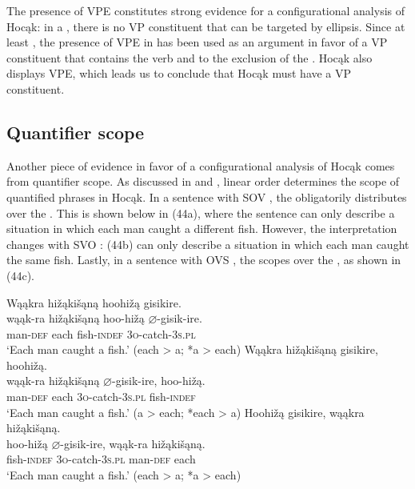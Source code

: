 \documentclass[output=paper]{LSP/langsci}
\begin{document}
The presence of VPE constitutes strong evidence for a configurational analysis of Hocąk: in a , there is no VP constituent that can be targeted by ellipsis. Since at least \citet{Ross1969}, the presence of VPE in  has been used as an argument in favor of a VP constituent that contains the verb and  to the exclusion of the . Hocąk also displays VPE, which leads us to conclude that Hocąk must have a VP constituent.

\subsection{Quantifier scope}

Another piece of evidence in favor of a configurational analysis of Hocąk comes from quantifier scope. As discussed in \citet{Johnson2014} and \citet{JohnsonRosen2014}, linear order determines the scope of quantified phrases in Hocąk. In a sentence with SOV , the  obligatorily distributes over the . This is shown below in (44a), where the sentence can only describe a situation in which each man caught a different fish. However, the interpretation changes with SVO : (44b) can only describe a situation in which each man caught the same fish. Lastly, in a sentence with OVS , the  scopes over the , as shown in (44c).

\begin{exe}
\ex\label{ex:jrs:44}
\begin{xlist}
\ex 
\glll Wąąkra	hi\v{z}ąki\v{s}ąną		hoohi\v{z}ą	gisikire.\\
wąąk-ra		hi\v{z}ąki\v{s}ąną		hoo-hi\v{z}ą	$\varnothing$-gisik-ire. \\
		man-\textsc{def}		each					fish-\textsc{indef}		\textsc{3o}-catch-\textsc{3s.pl} \\
\trans `Each man caught a fish.' (each > a; *a > each)
\ex 
\glll Wąąkra		hi\v{z}ąki\v{s}ąną		gisikire,			hoohi\v{z}ą.\\
wąąk-ra		hi\v{z}ąki\v{s}ąną		$\varnothing$-gisik-ire,	hoo-hi\v{z}ą. \\
		man-\textsc{def}		each					\textsc{3o}-catch-\textsc{3s.pl}		fish-\textsc{indef} \\
\trans `Each man caught a fish.'  (a > each; *each > a)
\ex 
\glll Hoohi\v{z}ą	gisikire,	wąąkra	 hi\v{z}ąki\v{s}ąną.\\
hoo-hi\v{z}ą	$\varnothing$-gisik-ire,		wąąk-ra	hi\v{z}ąki\v{s}ąną. \\
		fish-\textsc{indef}		\textsc{3o}-catch-\textsc{3s.pl}		man-\textsc{def}		each \\
\trans `Each man caught a fish.' (each > a; *a > each)
\end{xlist}
\end{exe}
\end{document}

